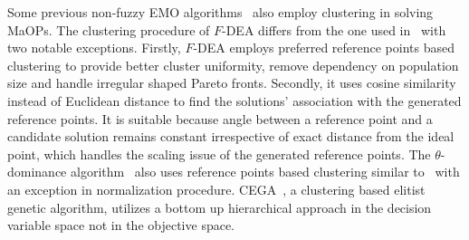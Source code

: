 \documentclass[review]{elsarticle}
\begin{document}
Some previous non-fuzzy EMO algorithms~\citep{deb2014evolutionary,thetadominance7080938,coellotwoapproach} also employ clustering in 
solving MaOPs. 
The clustering procedure of $F$-DEA differs from the one used in~\citep{deb2014evolutionary} with two notable exceptions. 
Firstly, $F$-DEA employs preferred reference points based clustering to provide better cluster uniformity, remove dependency on population size and handle irregular shaped Pareto fronts.
 Secondly, it uses cosine similarity instead of Euclidean distance to find the solutions' association with the generated reference points. It is suitable  because angle between a reference point and a candidate solution remains constant irrespective of exact distance from the ideal point, which handles the scaling issue of the generated reference points.
The  $\theta$-dominance algorithm~\citep{thetadominance7080938} also uses reference points based clustering similar 
to~\citep{deb2014evolutionary} with an exception in normalization procedure. CEGA~\citep{coellotwoapproach}, a clustering based elitist genetic algorithm, utilizes  a bottom up hierarchical approach  in the decision variable space not in the objective space. %
\end{document}
